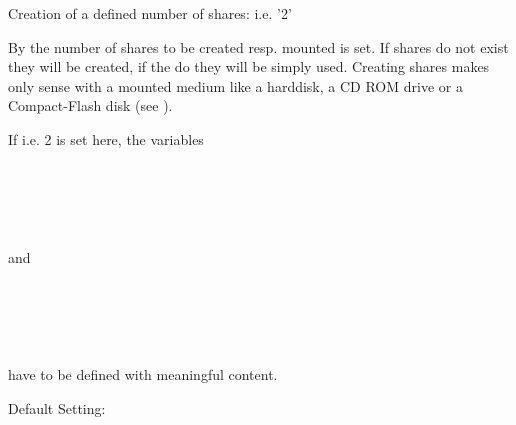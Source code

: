 \begin{description}

    Creation of a defined number of shares: i.e. '2'

    By  the number of shares to be created resp. mounted is set.
    If shares do not exist they will be created, if the do they will be simply used.
    Creating shares makes only sense with a mounted medium like a harddisk, a CD ROM
    drive or a Compact-Flash disk (see ).

    If i.e. 2 is set here, the variables\\

        \\
        \\
        \\
        \\
        \\

        and\\

        \\
        \\
        \\
        \\
        \\

        have to be defined with meaningful content.

        Default Setting: 

\end{description}

